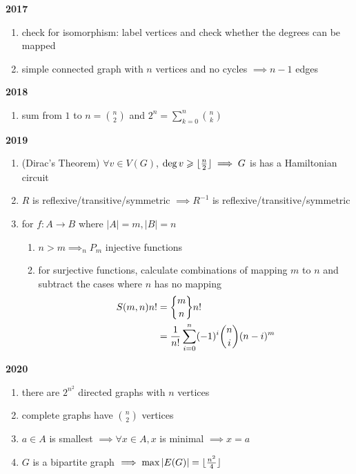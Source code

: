 \documentclass[landscape, a4paper]{article}
\DeclarePairedDelimiter\floor{\lfloor}{\rfloor}
\DeclareRobustCommand{\stirling}{\genfrac\{\}{0pt}{}}
\let\geq\geqslant
\newcommand{\heading}[1]{
    \noindent\textbf{#1}
}
\begin{document}
\begin{multicols*}{4}
    \heading{2017}
    \begin{enumerate}
        \item check for isomorphism: label vertices and check whether the degrees can be mapped
        \item simple connected graph with $n$ vertices and no cycles $\implies n-1$ edges
    \end{enumerate}
    \heading{2018}
    \begin{enumerate}
        \item sum from $1$ to $n=\binom{n}{2}$ and $2^n=\sum_{k=0}^n\binom{n}{k}$
    \end{enumerate}
    \heading{2019}
    \begin{enumerate}
        \item (Dirac's Theorem) $\forall v\in V(G)$, $\deg v\geq \floor{\frac{n}{2}}\implies G$ is has a Hamiltonian circuit
        \item $R$ is reflexive/transitive/symmetric $\implies R^{-1}$ is reflexive/transitive/symmetric
        \item for $f:A\rightarrow B$ where $|A|=m, |B|=n$
              \begin{enumerate}
                  \item $n>m\implies _n P_m$ injective functions
                  \item for surjective functions, calculate combinations of mapping $m$ to $n$ and subtract the cases where $n$ has no mapping\\
                        \begin{align*}
                            S(m,n)n! & =\stirling{m}{n}n!                                   \\
                                     & =\dfrac{1}{n!}\sum_{i=0}^n(-1)^i\dbinom{n}{i}(n-i)^m
                        \end{align*}
              \end{enumerate}
    \end{enumerate}
    \heading{2020}
    \begin{enumerate}
        \item there are $2^{n^2}$ directed graphs with $n$ vertices
        \item complete graphs have $\binom{n}{2}$ vertices
        \item $a\in A$ is smallest $\implies \forall x\in A, x$ is minimal $\implies x=a$
        \item $G$ is a bipartite graph $\implies\max |E(G)|=\floor{\frac{n^2}{4}}$

\end{enumerate}
\end{multicols*}
\end{document}
